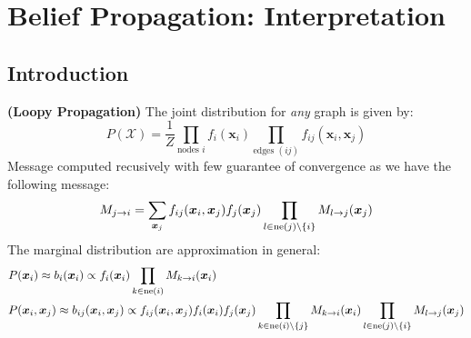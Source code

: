 \section{Belief Propagation: Interpretation}

\subsection{Introduction}

\begin{definition}{\textbf{(Loopy Propagation)}}
    The joint distribution for \emph{any} graph is given by:
    \begin{equation*}
        P(\mathcal{X}) = \frac{1}{Z}\prod_{\text{nodes } i} f_i(\boldsymbol x_i) \prod_{\text{edges } (ij)} f_{ij}(\boldsymbol x_i, \boldsymbol x_j)
    \end{equation*}
    Message computed recusively with few guarantee of convergence as we have the following message:
    \begin{equation*}
        M_{j\rightarrow i} = \sum_{\boldsymbol x_j} f_{ij}(\boldsymbol x_i, \boldsymbol x_j)f_j(\boldsymbol x_j)\prod_{l \in \operatorname{ne}(j)\backslash\left\{ i \right\}} M_{l\rightarrow j}(\boldsymbol x_j)
    \end{equation*}
    The marginal distribution are approximation in general:
    \begin{equation*}
    \begin{aligned}
        &P(\boldsymbol x_i) \approx b_i(\boldsymbol x_i) \propto f_i(\boldsymbol x_i)\prod_{k\in\operatorname{ne}(i)}M_{k\rightarrow i}(\boldsymbol x_i) \\
        &P(\boldsymbol x_i, \boldsymbol x_j) \approx b_{ij}(\boldsymbol x_i, \boldsymbol x_j) \propto f_{ij}(\boldsymbol x_i, \boldsymbol x_j)f_i(\boldsymbol x_i)f_j(\boldsymbol x_j)\prod_{k\in\operatorname{ne}(i)\backslash \left\{ j \right\}} M_{k\rightarrow i}(\boldsymbol x_i)\prod_{l\in\operatorname{ne}(j)\backslash \left\{ i \right\}}M_{l\rightarrow j}(\boldsymbol x_j)
    \end{aligned}
    \end{equation*}
\end{definition}

